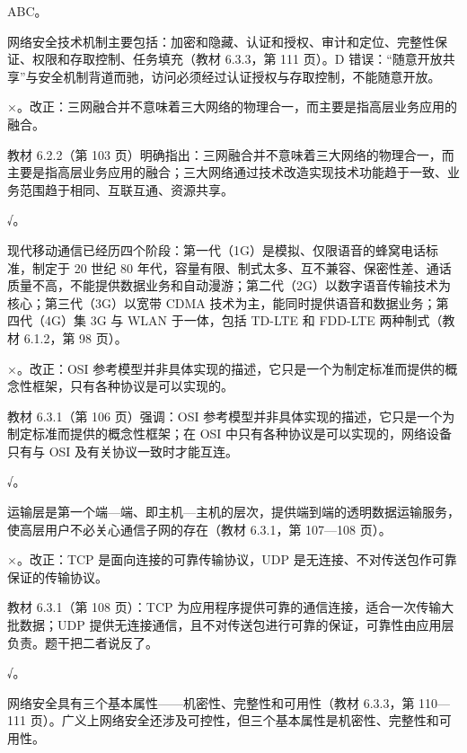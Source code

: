 \documentclass[a4paper,11pt]{article}
\begin{document}
\q ABC。\begin{analysis}网络安全技术机制主要包括：加密和隐藏、认证和授权、审计和定位、完整性保证、权限和存取控制、任务填充（教材 6.3.3，第 111 页）。D 错误：“随意开放共享”与安全机制背道而驰，访问必须经过认证授权与存取控制，不能随意开放。\end{analysis}


\q ×。改正：三网融合并不意味着三大网络的物理合一，而主要是指高层业务应用的融合。\begin{analysis}教材 6.2.2（第 103 页）明确指出：三网融合并不意味着三大网络的物理合一，而主要是指高层业务应用的融合；三大网络通过技术改造实现技术功能趋于一致、业务范围趋于相同、互联互通、资源共享。\end{analysis}

\q √。\begin{analysis}现代移动通信已经历四个阶段：第一代（1G）是模拟、仅限语音的蜂窝电话标准，制定于 20 世纪 80 年代，容量有限、制式太多、互不兼容、保密性差、通话质量不高，不能提供数据业务和自动漫游；第二代（2G）以数字语音传输技术为核心；第三代（3G）以宽带 CDMA 技术为主，能同时提供语音和数据业务；第四代（4G）集 3G 与 WLAN 于一体，包括 TD-LTE 和 FDD-LTE 两种制式（教材 6.1.2，第 98 页）。\end{analysis}

\q ×。改正：OSI 参考模型并非具体实现的描述，它只是一个为制定标准而提供的概念性框架，只有各种协议是可以实现的。\begin{analysis}教材 6.3.1（第 106 页）强调：OSI 参考模型并非具体实现的描述，它只是一个为制定标准而提供的概念性框架；在 OSI 中只有各种协议是可以实现的，网络设备只有与 OSI 及有关协议一致时才能互连。\end{analysis}

\q √。\begin{analysis}运输层是第一个端—端、即主机—主机的层次，提供端到端的透明数据运输服务，使高层用户不必关心通信子网的存在（教材 6.3.1，第 107—108 页）。\end{analysis}

\q ×。改正：TCP 是面向连接的可靠传输协议，UDP 是无连接、不对传送包作可靠保证的传输协议。\begin{analysis}教材 6.3.1（第 108 页）：TCP 为应用程序提供可靠的通信连接，适合一次传输大批数据；UDP 提供无连接通信，且不对传送包进行可靠的保证，可靠性由应用层负责。题干把二者说反了。\end{analysis}

\q √。\begin{analysis}网络安全具有三个基本属性——机密性、完整性和可用性（教材 6.3.3，第 110—111 页）。广义上网络安全还涉及可控性，但三个基本属性是机密性、完整性和可用性。\end{analysis}
\end{document}
